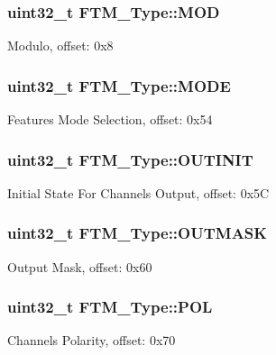 \subsubsection[{\texorpdfstring{M\+OD}{MOD}}]{ uint32\+\_\+t F\+T\+M\+\_\+\+Type\+::\+M\+OD}\hypertarget{structFTM__Type_aeb4a6a58257ebece333d61778bde756c}{}\label{structFTM__Type_aeb4a6a58257ebece333d61778bde756c}
Modulo, offset\+: 0x8 
\subsubsection[{\texorpdfstring{M\+O\+DE}{MODE}}]{ uint32\+\_\+t F\+T\+M\+\_\+\+Type\+::\+M\+O\+DE}\hypertarget{structFTM__Type_a18f2ef364d8c9e9217b35054fc5726be}{}\label{structFTM__Type_a18f2ef364d8c9e9217b35054fc5726be}
Features Mode Selection, offset\+: 0x54 
\subsubsection[{\texorpdfstring{O\+U\+T\+I\+N\+IT}{OUTINIT}}]{ uint32\+\_\+t F\+T\+M\+\_\+\+Type\+::\+O\+U\+T\+I\+N\+IT}\hypertarget{structFTM__Type_aeed5243aad98ae4a5f0f4eb769ee5da9}{}\label{structFTM__Type_aeed5243aad98ae4a5f0f4eb769ee5da9}
Initial State For Channels Output, offset\+: 0x5C 
\subsubsection[{\texorpdfstring{O\+U\+T\+M\+A\+SK}{OUTMASK}}]{ uint32\+\_\+t F\+T\+M\+\_\+\+Type\+::\+O\+U\+T\+M\+A\+SK}\hypertarget{structFTM__Type_a624050c92b74b9952d2cde560e5ee41c}{}\label{structFTM__Type_a624050c92b74b9952d2cde560e5ee41c}
Output Mask, offset\+: 0x60 
\subsubsection[{\texorpdfstring{P\+OL}{POL}}]{ uint32\+\_\+t F\+T\+M\+\_\+\+Type\+::\+P\+OL}\hypertarget{structFTM__Type_a1a1989ba477755de85476e2c012fd918}{}\label{structFTM__Type_a1a1989ba477755de85476e2c012fd918}
Channels Polarity, offset\+: 0x70 
